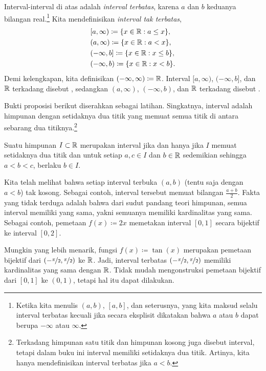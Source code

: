 Interval-interval di atas adalah \emph{interval terbatas}, karena $a$ dan $b$ keduanya bilangan real.\footnote{Ketika kita menulis
$(a,b)$, $[a,b]$, dan seterusnya, yang kita maksud selalu interval terbatas kecuali jika secara eksplisit dikatakan
bahwa $a$ atau $b$ dapat berupa $-\infty$ atau $\infty$.}
Kita mendefinisikan \emph{interval tak terbatas},
\begin{align*}
& [a,\infty) \coloneqq \{ x \in {\mathbb{R}} : a \leq x \}, \\
& (a,\infty) \coloneqq \{ x \in {\mathbb{R}} : a < x \}, \\
& (-\infty,b] \coloneqq \{ x \in {\mathbb{R}} : x \leq b \}, \\
& (-\infty,b) \coloneqq \{ x \in {\mathbb{R}} : x < b \} .
\end{align*}
Demi kelengkapan, kita definisikan $(-\infty,\infty) \coloneqq {\mathbb{R}}$.
Interval $[a,\infty)$, $(-\infty,b]$, dan ${\mathbb{R}}$ terkadang disebut
\emph{},
sedangkan $(a,\infty)$, $(-\infty,b)$, dan ${\mathbb{R}}$ terkadang disebut
\emph{}.

Bukti proposisi berikut diserahkan sebagai latihan.
Singkatnya, interval adalah himpunan dengan setidaknya dua titik
yang memuat semua titik di antara sebarang dua
titiknya.\footnote{Terkadang himpunan satu titik dan himpunan kosong
juga disebut interval, tetapi dalam buku ini interval memiliki setidaknya dua titik.
Artinya, kita hanya mendefinisikan interval terbatas jika $a < b$.}

\begin{prop} \label{prop:intervaldef}
Suatu himpunan $I \subset {\mathbb{R}}$ merupakan interval jika dan hanya jika
$I$ memuat setidaknya dua titik dan
untuk setiap $a,c \in I$ dan $b \in {\mathbb{R}}$ sedemikian sehingga $a < b < c$, berlaku $b \in I$.
\end{prop}

Kita telah melihat bahwa setiap interval terbuka $(a,b)$ (tentu saja dengan $a < b$)
tak kosong.  Sebagai contoh, interval tersebut memuat bilangan $\frac{a+b}{2}$.
Fakta yang tidak terduga adalah bahwa dari sudut pandang teori himpunan,
semua interval memiliki  yang sama, yakni semuanya memiliki
kardinalitas yang sama.  Sebagai contoh, pemetaan $f(x) \coloneqq 2x$
memetakan interval $[0,1]$ secara bijektif ke interval $[0,2]$.

Mungkin yang lebih menarik,
fungsi $f(x) \coloneqq \tan(x)$
merupakan pemetaan bijektif dari $(-\nicefrac{\pi}{2},\nicefrac{\pi}{2})$ ke ${\mathbb{R}}$.  Jadi, interval terbatas
$(-\nicefrac{\pi}{2},\nicefrac{\pi}{2})$ memiliki kardinalitas yang sama dengan ${\mathbb{R}}$.  Tidak mudah
mengonstruksi pemetaan bijektif dari $[0,1]$ ke
$(0,1)$, tetapi hal itu dapat dilakukan.

